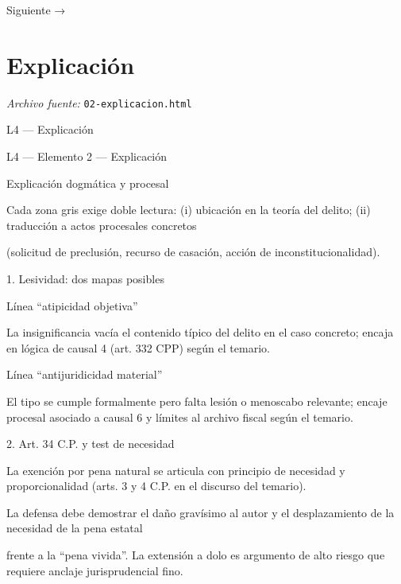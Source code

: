 \documentclass[11pt,a4paper]{article}
\begin{document}
    Siguiente →\par

\section{Explicaci\'on}
\noindent\textit{Archivo fuente:} \texttt{02-explicacion.html}

L4 — Explicación\par





    L4 — Elemento 2 — Explicación\par
    Explicación dogmática y procesal\par


      Cada zona gris exige doble lectura: (i) ubicación en la teoría del delito; (ii) traducción a actos procesales concretos\par
      (solicitud de preclusión, recurso de casación, acción de inconstitucionalidad).\par



      1. Lesividad: dos mapas posibles\par



          Línea “atipicidad objetiva”\par

          La insignificancia vacía el contenido típico del delito en el caso concreto; encaja en lógica de causal 4 (art. 332 CPP) según el temario.\par




          Línea “antijuridicidad material”\par

          El tipo se cumple formalmente pero falta lesión o menoscabo relevante; encaje procesal asociado a causal 6 y límites al archivo fiscal según el temario.\par








      2. Art. 34 C.P. y test de necesidad\par


        La exención por pena natural se articula con principio de necesidad y proporcionalidad (arts. 3 y 4 C.P. en el discurso del temario).\par
        La defensa debe demostrar el daño gravísimo al autor y el desplazamiento de la necesidad de la pena estatal\par
        frente a la “pena vivida”. La extensión a dolo es argumento de alto riesgo que requiere anclaje jurisprudencial fino.\par
\end{document}
